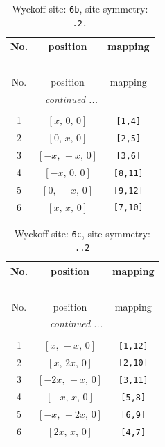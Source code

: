 \documentclass[fleqn,8pt]{jsarticle}
\begin{document}
\begin{longtable}{ccc}
\caption{Wyckoff site: {\tt 6b}, site symmetry: {\tt .2.}}
 \\
 \hline \hline
No. & position & mapping \\ \hline \endfirsthead

\multicolumn{2}{l}{\tablename\ \thetable{}} \\
 \hline \hline
No. & position & mapping \\ \hline \endhead

 \hline \hline
\multicolumn{2}{r}{\footnotesize\it continued ...} \\ \endfoot

 \hline \hline
\multicolumn{2}{r}{} \\ \endlastfoot

1 & $\left[ x,\, 0,\, 0 \right]$ & {\tt [1,4]} \\ \hline
2 & $\left[ 0,\, x,\, 0 \right]$ & {\tt [2,5]} \\ \hline
3 & $\left[ - x,\, - x,\, 0 \right]$ & {\tt [3,6]} \\ \hline
4 & $\left[ - x,\, 0,\, 0 \right]$ & {\tt [8,11]} \\ \hline
5 & $\left[ 0,\, - x,\, 0 \right]$ & {\tt [9,12]} \\ \hline
6 & $\left[ x,\, x,\, 0 \right]$ & {\tt [7,10]} \\
\end{longtable}
\renewcommand{\arraystretch}{1.2}
\begin{longtable}{ccc}
\caption{Wyckoff site: {\tt 6c}, site symmetry: {\tt ..2}}
 \\
 \hline \hline
No. & position & mapping \\ \hline \endfirsthead

\multicolumn{2}{l}{\tablename\ \thetable{}} \\
 \hline \hline
No. & position & mapping \\ \hline \endhead

 \hline \hline
\multicolumn{2}{r}{\footnotesize\it continued ...} \\ \endfoot

 \hline \hline
\multicolumn{2}{r}{} \\ \endlastfoot

1 & $\left[ x,\, - x,\, 0 \right]$ & {\tt [1,12]} \\ \hline
2 & $\left[ x,\, 2 x,\, 0 \right]$ & {\tt [2,10]} \\ \hline
3 & $\left[ - 2 x,\, - x,\, 0 \right]$ & {\tt [3,11]} \\ \hline
4 & $\left[ - x,\, x,\, 0 \right]$ & {\tt [5,8]} \\ \hline
5 & $\left[ - x,\, - 2 x,\, 0 \right]$ & {\tt [6,9]} \\ \hline
6 & $\left[ 2 x,\, x,\, 0 \right]$ & {\tt [4,7]} \\
\end{longtable}
\end{document}

